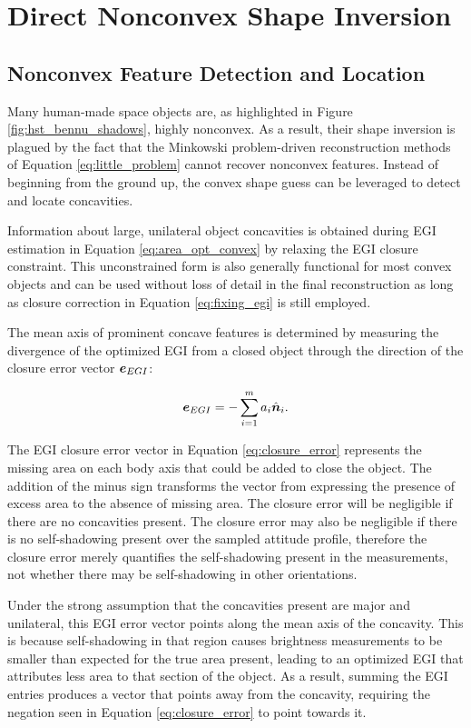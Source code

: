 \section{Direct Nonconvex Shape Inversion}

\subsection{Nonconvex Feature Detection and Location}

Many human-made space objects are, as highlighted in Figure \ref{fig:hst_bennu_shadows}, highly nonconvex. As a result, their shape inversion is plagued by the fact that the Minkowski problem-driven reconstruction methods of Equation \ref{eq:little_problem} cannot recover nonconvex features. Instead of beginning from the ground up, the convex shape guess can be leveraged to detect and locate concavities.

Information about large, unilateral object concavities is obtained during EGI estimation in Equation \ref{eq:area_opt_convex} by relaxing the EGI closure constraint. This unconstrained form is also generally functional for most convex objects and can be used without loss of detail in the final reconstruction as long as closure correction in Equation \ref{eq:fixing_egi} is still employed.

The mean axis of prominent concave features is determined by measuring the divergence of the optimized EGI from a closed object through the direction of the closure error vector $\bm{e}_{EGI}$:

\begin{equation} \label{eq:closure_error}
  \bm{e}_{EGI} = -\sum_{i=1}^{m} a_i \hat{\bm{n}}_i.
\end{equation}

The EGI closure error vector in Equation \ref{eq:closure_error} represents the missing area on each body axis that could be added to close the object. The addition of the minus sign transforms the vector from expressing the presence of excess area to the absence of missing area. The closure error will be negligible if there are no concavities present. The closure error may also be negligible if there is no self-shadowing present over the sampled attitude profile, therefore the closure error merely quantifies the self-shadowing present in the measurements, not whether there may be self-shadowing in other orientations.

Under the strong assumption that the concavities present are major and unilateral, this EGI error vector points along the mean axis of the concavity. This is because self-shadowing in that region causes brightness measurements to be smaller than expected for the true area present, leading to an optimized EGI that attributes less area to that section of the object. As a result, summing the EGI entries produces a vector that points away from the concavity, requiring the negation seen in Equation \ref{eq:closure_error} to point towards it.

